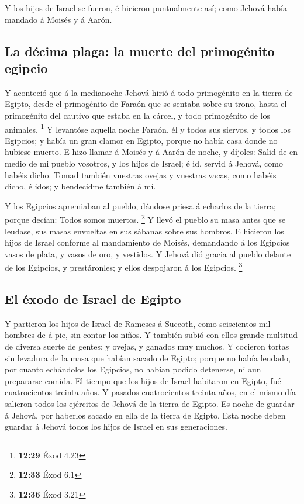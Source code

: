  Y los hijos de Israel se fueron, é hicieron puntualmente
así; como Jehová había mandado á Moisés y á Aarón.

\hypertarget{la-duxe9cima-plaga-la-muerte-del-primoguxe9nito-egipcio}{%
\subsection{La décima plaga: la muerte del primogénito
egipcio}\label{la-duxe9cima-plaga-la-muerte-del-primoguxe9nito-egipcio}}

 Y aconteció que á la medianoche Jehová hirió á todo
primogénito en la tierra de Egipto, desde el primogénito de Faraón que
se sentaba sobre su trono, hasta el primogénito del cautivo que estaba
en la cárcel, y todo primogénito de los animales. \footnote{\textbf{12:29}
  Éxod 4,23}  Y levantóse aquella noche Faraón, él y todos
sus siervos, y todos los Egipcios; y había un gran clamor en Egipto,
porque no había casa donde no hubiese muerto.  E hizo
llamar á Moisés y á Aarón de noche, y díjoles: Salid de en medio de mi
pueblo vosotros, y los hijos de Israel; é id, servid á Jehová, como
habéis dicho.  Tomad también vuestras ovejas y vuestras
vacas, como habéis dicho, é idos; y bendecidme también á mí.

 Y los Egipcios apremiaban al pueblo, dándose priesa á
echarlos de la tierra; porque decían: Todos somos muertos. \footnote{\textbf{12:33}
  Éxod 6,1}  Y llevó el pueblo su masa antes que se
leudase, sus masas envueltas en sus sábanas sobre sus hombros.
 E hicieron los hijos de Israel conforme al mandamiento de
Moisés, demandando á los Egipcios vasos de plata, y vasos de oro, y
vestidos.  Y Jehová dió gracia al pueblo delante de los
Egipcios, y prestáronles; y ellos despojaron á los Egipcios. \footnote{\textbf{12:36}
  Éxod 3,21}

\hypertarget{el-uxe9xodo-de-israel-de-egipto}{%
\subsection{El éxodo de Israel de
Egipto}\label{el-uxe9xodo-de-israel-de-egipto}}

 Y partieron los hijos de Israel de Rameses á Succoth, como
seiscientos mil hombres de á pie, sin contar los niños.  Y
también subió con ellos grande multitud de diversa suerte de gentes; y
ovejas, y ganados muy muchos.  Y cocieron tortas sin
levadura de la masa que habían sacado de Egipto; porque no había
leudado, por cuanto echándolos los Egipcios, no habían podido detenerse,
ni aun prepararse comida.  El tiempo que los hijos de
Israel habitaron en Egipto, fué cuatrocientos treinta años.
 Y pasados cuatrocientos treinta años, en el mismo día
salieron todos los ejércitos de Jehová de la tierra de Egipto.
 Es noche de guardar á Jehová, por haberlos sacado en ella
de la tierra de Egipto. Esta noche deben guardar á Jehová todos los
hijos de Israel en sus generaciones.

